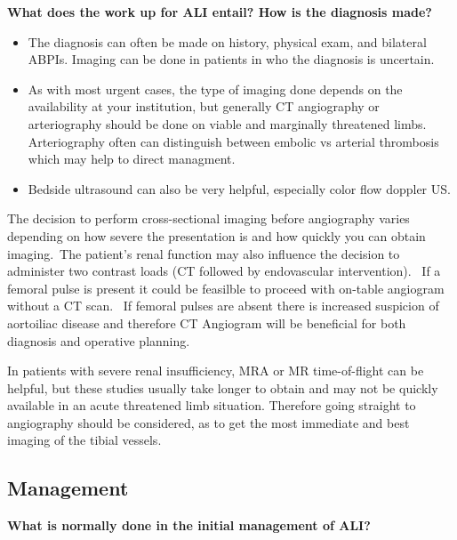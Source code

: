 \documentclass[
]{book}
\begin{document}
\textbf{What does the work up for ALI entail? How is the diagnosis
made?}

\begin{itemize}
\item
  The diagnosis can often be made on history, physical exam, and
  bilateral ABPIs. Imaging can be done in patients in who the diagnosis
  is uncertain.
\item
  As with most urgent cases, the type of imaging done depends on the
  availability at your institution, but generally CT angiography or
  arteriography should be done on viable and marginally threatened limbs.
  Arteriography often can distinguish between embolic vs arterial thrombosis
  which may help to direct managment.
\item
  Bedside ultrasound can also be very helpful, especially color flow
  doppler US.
\end{itemize}

The decision to perform cross-sectional imaging before angiography varies
depending on how severe the presentation is and how quickly you can obtain
imaging.~The patient's renal function may also influence the decision to
administer two contrast loads (CT followed by endovascular intervention).~
If a femoral pulse is present it could be feasilble to proceed with on-table
angiogram without a CT scan.~ If femoral pulses are absent there is increased
suspicion of aortoiliac disease and therefore CT Angiogram will be beneficial for
both diagnosis and operative planning.

In patients with severe renal insufficiency, MRA or MR time-of-flight
can be helpful, but these studies usually take longer to obtain
and may not be quickly available in an acute threatened limb situation.
Therefore going straight to angiography should be considered, as to get the
most immediate and best imaging of the tibial vessels. \citep{creagerClinicalPracticeAcute2012, earnshaw100AcuteLimb2019}

\hypertarget{management-19}{%
\subsection{Management}\label{management-19}}

\textbf{What is normally done in the initial management of ALI?}
\end{document}
